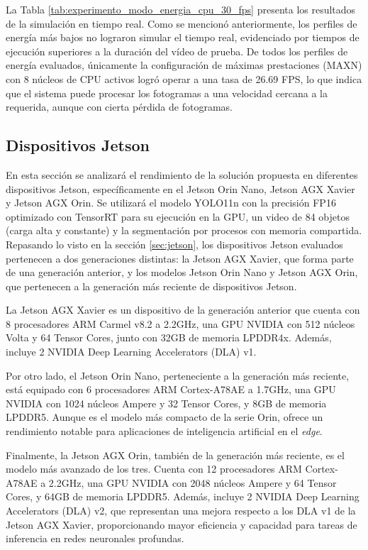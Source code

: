 \documentclass[11pt,spanish,listoffigures,listoftables]{tfgetsinf}
\begin{document}
      La Tabla \ref{tab:experimento_modo_energia_cpu_30_fps} presenta los resultados de la simulación en tiempo real. Como se mencionó anteriormente, los perfiles de energía más bajos no lograron simular el tiempo real, evidenciado por tiempos de ejecución superiores a la duración del vídeo de prueba. De todos los perfiles de energía evaluados, únicamente la configuración de máximas prestaciones (MAXN) con 8 núcleos de CPU activos logró operar a una tasa de 26.69 FPS, lo que indica que el sistema puede procesar los fotogramas a una velocidad cercana a la requerida, aunque con cierta pérdida de fotogramas.



\subsection{Dispositivos Jetson} \label{sec:dispositivos_jetson}
En esta sección se analizará el rendimiento de la solución propuesta en diferentes dispositivos Jetson, específicamente en el Jetson Orin Nano, Jetson AGX Xavier  y Jetson AGX Orin. Se utilizará el modelo YOLO11n con la precisión FP16 optimizado con TensorRT para su ejecución en la GPU, un video de 84 objetos (carga alta y constante) y la segmentación por procesos con memoria compartida.
Repasando lo visto en la sección \ref{sec:jetson}, los dispositivos Jetson evaluados pertenecen a dos generaciones distintas: la Jetson AGX Xavier, que forma parte de una generación anterior, y los modelos Jetson Orin Nano y Jetson AGX Orin, que pertenecen a la generación más reciente de dispositivos Jetson.

La Jetson AGX Xavier es un dispositivo de la generación anterior que cuenta con 8 procesadores ARM Carmel v8.2 a 2.2GHz, una GPU NVIDIA con 512 núcleos Volta y 64 Tensor Cores, junto con 32GB de memoria LPDDR4x. Además, incluye 2 NVIDIA Deep Learning Accelerators (DLA) v1.

Por otro lado, el Jetson Orin Nano, perteneciente a la generación más reciente, está equipado con 6 procesadores ARM Cortex-A78AE a 1.7GHz, una GPU NVIDIA con 1024 núcleos Ampere y 32 Tensor Cores, y 8GB de memoria LPDDR5. Aunque es el modelo más compacto de la serie Orin, ofrece un rendimiento notable para aplicaciones de inteligencia artificial en el \textit{edge}.

Finalmente, la Jetson AGX Orin, también de la generación más reciente, es el modelo más avanzado de los tres. Cuenta con 12 procesadores ARM Cortex-A78AE a 2.2GHz, una GPU NVIDIA con 2048 núcleos Ampere y 64 Tensor Cores, y 64GB de memoria LPDDR5. Además, incluye 2 NVIDIA Deep Learning Accelerators (DLA) v2, que representan una mejora respecto a los DLA v1 de la Jetson AGX Xavier, proporcionando mayor eficiencia y capacidad para tareas de inferencia en redes neuronales profundas.
\end{document}
